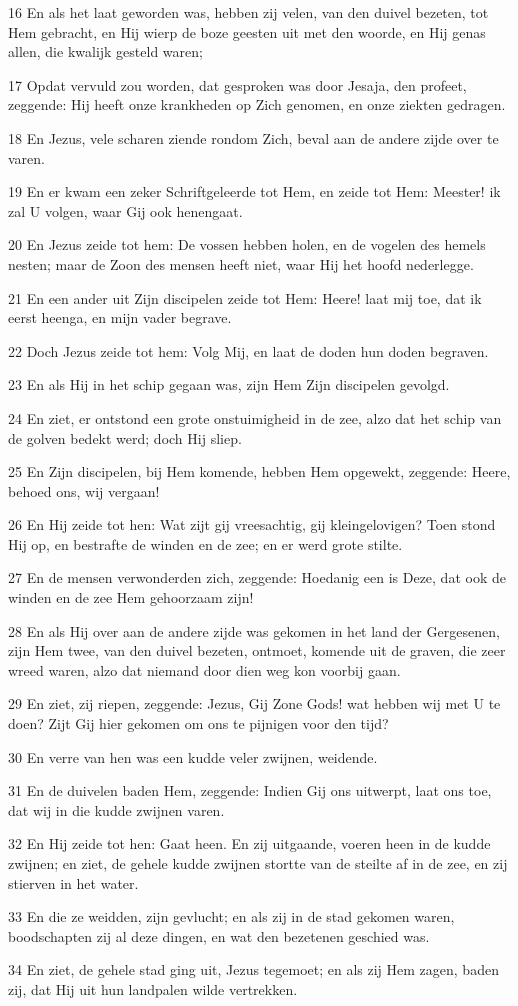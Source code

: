 \par 16 En als het laat geworden was, hebben zij velen, van den duivel bezeten, tot Hem gebracht, en Hij wierp de boze geesten uit met den woorde, en Hij genas allen, die kwalijk gesteld waren;
\par 17 Opdat vervuld zou worden, dat gesproken was door Jesaja, den profeet, zeggende: Hij heeft onze krankheden op Zich genomen, en onze ziekten gedragen.
\par 18 En Jezus, vele scharen ziende rondom Zich, beval aan de andere zijde over te varen.
\par 19 En er kwam een zeker Schriftgeleerde tot Hem, en zeide tot Hem: Meester! ik zal U volgen, waar Gij ook henengaat.
\par 20 En Jezus zeide tot hem: De vossen hebben holen, en de vogelen des hemels nesten; maar de Zoon des mensen heeft niet, waar Hij het hoofd nederlegge.
\par 21 En een ander uit Zijn discipelen zeide tot Hem: Heere! laat mij toe, dat ik eerst heenga, en mijn vader begrave.
\par 22 Doch Jezus zeide tot hem: Volg Mij, en laat de doden hun doden begraven.
\par 23 En als Hij in het schip gegaan was, zijn Hem Zijn discipelen gevolgd.
\par 24 En ziet, er ontstond een grote onstuimigheid in de zee, alzo dat het schip van de golven bedekt werd; doch Hij sliep.
\par 25 En Zijn discipelen, bij Hem komende, hebben Hem opgewekt, zeggende: Heere, behoed ons, wij vergaan!
\par 26 En Hij zeide tot hen: Wat zijt gij vreesachtig, gij kleingelovigen? Toen stond Hij op, en bestrafte de winden en de zee; en er werd grote stilte.
\par 27 En de mensen verwonderden zich, zeggende: Hoedanig een is Deze, dat ook de winden en de zee Hem gehoorzaam zijn!
\par 28 En als Hij over aan de andere zijde was gekomen in het land der Gergesenen, zijn Hem twee, van den duivel bezeten, ontmoet, komende uit de graven, die zeer wreed waren, alzo dat niemand door dien weg kon voorbij gaan.
\par 29 En ziet, zij riepen, zeggende: Jezus, Gij Zone Gods! wat hebben wij met U te doen? Zijt Gij hier gekomen om ons te pijnigen voor den tijd?
\par 30 En verre van hen was een kudde veler zwijnen, weidende.
\par 31 En de duivelen baden Hem, zeggende: Indien Gij ons uitwerpt, laat ons toe, dat wij in die kudde zwijnen varen.
\par 32 En Hij zeide tot hen: Gaat heen. En zij uitgaande, voeren heen in de kudde zwijnen; en ziet, de gehele kudde zwijnen stortte van de steilte af in de zee, en zij stierven in het water.
\par 33 En die ze weidden, zijn gevlucht; en als zij in de stad gekomen waren, boodschapten zij al deze dingen, en wat den bezetenen geschied was.
\par 34 En ziet, de gehele stad ging uit, Jezus tegemoet; en als zij Hem zagen, baden zij, dat Hij uit hun landpalen wilde vertrekken.


